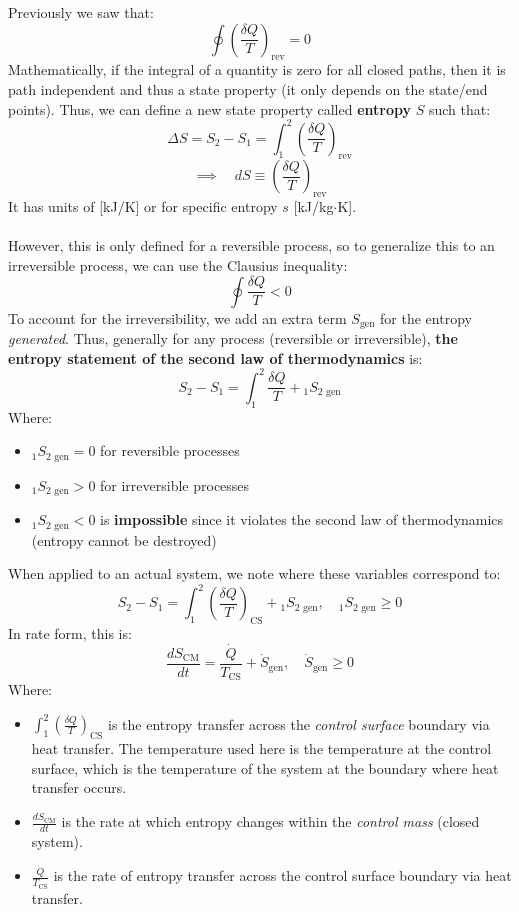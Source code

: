 \documentclass[12pt]{article}
\begin{document}
Previously we saw that:
\[\oint \left(\frac{\delta Q}{T}\right)_\text{rev} = 0\]
Mathematically, if the integral of a quantity is zero for all closed paths, then it is path independent and thus a state property (it only depends on the state/end points). Thus, we can define a new state property called \textbf{entropy} $S$ such that:
\[\Delta S = S_2-S_1 = \int_1^2 \left(\frac{\delta Q}{T}\right)_\text{rev}\]
\[\implies \quad \boxed{dS \equiv \left(\frac{\delta Q}{T}\right)_\text{rev}}\]
It has units of [kJ/K] or for specific entropy $s$ [kJ/kg$\cdot$K].\\\\
However, this is only defined for a reversible process, so to generalize this to an irreversible process, we can use the Clausius inequality:
\[\oint \frac{\delta Q}{T} < 0 \]
To account for the irreversibility, we add an extra term $S_\text{gen}$ for the entropy \textit{generated}. Thus, generally for any process (reversible or irreversible), \textbf{the entropy statement of the second law of thermodynamics} is:
\[S_2 - S_1 = \int_{1}^{2} \frac{\delta Q}{T} + {}_1S_{2\text{ gen}}\]
Where:
\begin{itemize}
    \item ${}_1S_{2\text{ gen}}=0$ for reversible processes
    \item ${}_1S_{2\text{ gen}}>0$ for irreversible processes
    \item ${}_1S_{2\text{ gen}}<0$ is \textbf{impossible} since it violates the second law of thermodynamics (entropy cannot be destroyed)
\end{itemize}
When applied to an actual system, we note where these variables correspond to:
\[\boxed{S_2 - S_1 = \int_{1}^{2} \left(\frac{\delta Q}{T}\right)_\text{CS} + {}_1S_{2\text{ gen}},\quad {}_1S_{2\text{ gen}}\geq 0 }\]
In rate form, this is:
\[\boxed{\frac{dS_\text{CM}}{dt} = \frac{\dot{Q}}{T_\text{CS}}+\dot{S}_\text{gen},\quad \dot{S}_\text{gen}\geq 0}\]
Where:
\begin{itemize}
    \item $\int_{1}^{2} \left(\frac{\delta Q}{T}\right)_\text{CS}$ is the entropy transfer across the \textit{control surface} boundary via heat transfer. The temperature used here is the temperature at the control surface, which is the temperature of the system at the boundary where heat transfer occurs.
    \item $\frac{dS_\text{CM}}{dt}$ is the rate at which entropy changes within the \textit{control mass} (closed system).
    \item $\frac{\dot{Q}}{T_\text{CS}}$ is the rate of entropy transfer across the control surface boundary via heat transfer.
\end{itemize}
\end{document}
